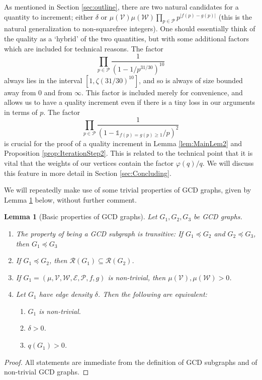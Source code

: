 \documentclass[12pt]{amsart}
\numberwithin{equation}{section}
\newtheorem{lem}{Lemma}[section]
\theoremstyle{definition}
\theoremstyle{remark}
\newcommand{\CE}{\mathcal{E}}
\newcommand{\CP}{\mathcal{P}}
\newcommand{\CR}{\mathcal{R}}
\newcommand{\CV}{\mathcal{V}}
\newcommand{\CW}{\mathcal{W}}
\newcommand{\un}{\mathds{1}}
\renewcommand{\phi}{\varphi}
\renewcommand{\ge}{\geqslant}
\begin{document}
As mentioned in Section \ref{sec:outline}, there are two natural candidates for a quantity to increment; either $\delta$ or 
$\mu(\CV)\mu(\CW)\prod_{p\in\CP}p^{|f(p)-g(p)|}$ (this is the natural generalization to non-squarefree integers). One should essentially think of the quality as a `hybrid' of the two quantities, but with some additional factors which are included for technical reasons.  The factor
\[
\prod_{p\in\CP}\frac{1}{(1-1/p^{31/30})^{10}}
\]
always lies in the interval $[1,\zeta(31/30)^{10}]$, and so is always of size bounded away from 0 and from $\infty$. This factor is included merely for convenience, and allows us to have a quality increment even if there is a tiny loss in our arguments in terms of $p$. The factor 
\[
\prod_{p\in\CP}\frac{1}{(1-\un_{f(p)=g(p)\ge 1}/p)^2}
\]
is crucial for the proof of a quality increment in Lemma \ref{lem:MainLem2} and Proposition \ref{prop:IterationStep2}. This is related to the technical point that it is vital that the weights of our vertices contain the factor $\phi(q)/q$. We will discuss this feature in more detail in Section \ref{sec:Concluding}.


\medskip

We will repeatedly make use of some trivial properties of GCD graphs, given by Lemma \ref{lem:Trivial} below, without further comment.
\begin{lem}[Basic properties of GCD graphs]\label{lem:Trivial} 
	Let $G_1,G_2,G_3$ be GCD graphs.
	\begin{enumerate} 	
				\item The property of being a GCD subgraph is transitive: If $G_1\preceq G_2$ and $G_2\preceq G_3$, then $G_1\preceq G_3$
				\item If $G_1\preceq G_2$, then $\CR(G_1)\subseteq \CR(G_2)$.
				\item If  $G_1=(\mu,\CV,\CW,\CE,\CP,f,g)$ is non-trivial, then $\mu(\CV),\mu(\CW)>0$.
				\item Let $G_1$ have edge density $\delta$. Then the following are equivalent:
				\begin{enumerate}
					\item $G_1$ is non-trivial. 
					\item $\delta>0$.
					\item $q(G_1)>0$.
				\end{enumerate}
	\end{enumerate}
\end{lem}
\begin{proof}
All statements are immediate from the definition of GCD subgraphs and of non-trivial GCD graphs.
\end{proof}
\end{document}
